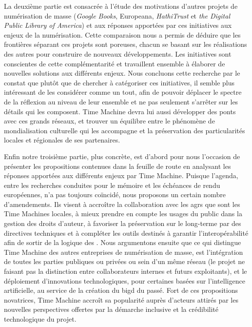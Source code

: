 La deuxième partie est consacrée à l'étude des motivations d'autres projets de numérisation de masse (\textit{Google Books}, Europeana, \textit{HathiTrust} et \textit{the Digital Public Library of America}) et aux réponses apportées par ces initiatives aux enjeux de la numérisation. Cette comparaison nous a permis de déduire que les frontières séparant ces projets sont poreuses, chacun se basant sur les réalisations des autres pour construire de nouveaux développements. Les initiatives sont conscientes de cette complémentarité et travaillent ensemble à élaborer de nouvelles solutions aux différents enjeux. Nous concluons cette recherche par le constat que plutôt que de chercher à catégoriser ces initiatives, il semble plus intéressant de les considérer comme un tout, afin de pouvoir déplacer le spectre de la réflexion au niveau de leur ensemble et ne pas seulement s'arrêter sur les détails qui les composent. Time Machine devra lui aussi développer des ponts avec ces grands réseaux, et trouver un équilibre entre le phénomène de mondialisation culturelle qui les accompagne et la préservation des particularités locales et régionales de ses partenaires.

Enfin notre troisième partie, plus concrète, est d'abord pour nous l'occasion de présenter les propositions contenues dans la feuille de route en analysant les réponses apportées aux différents enjeux par Time Machine. Puisque l'agenda, entre les recherches conduites pour le mémoire et les échéances de rendu européennes, n'a pas toujours coïncidé, nous proposons un certain nombre d'amendements. Ils visent à accroître la collaboration avec les \gls{agr}s que sont les Time Machines locales, à mieux prendre en compte les usages du public dans la gestion des droits d'auteur, à favoriser la préservation sur le long-terme par des directives techniques et à compléter les outils destinés à garantir l'interopérabilité afin de sortir de la logique des . Nous argumentons ensuite que ce qui distingue Time Machine des autres entreprises de numérisation de masse, est l'intégration de toutes les parties publiques ou privées ou sein d'un même réseau (le projet ne faisant pas la distinction entre collaborateurs internes et futurs exploitants), et le déploiement d'innovations technologiques, pour certaines basées sur l'intelligence artificielle, au service de la création du \gls{bigd} du passé. Fort de ces propositions novatrices, Time Machine accroît sa popularité auprès d'acteurs attirés par les nouvelles perspectives offertes par la démarche inclusive et la crédibilité technologique du projet.

